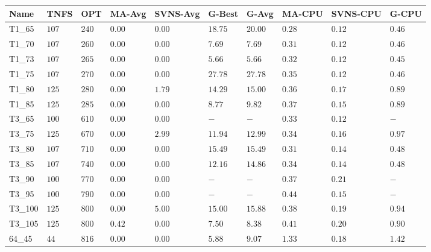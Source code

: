 \begin{center}
    \begin{table}[]
    \centering
    \begin{adjustwidth}{-0.4in}{-1in}
    \begin{tabular}{|lll|l|l|ll|lll|}
\hline
Name    & TNFS    & OPT    & MA-Avg & SVNS-Avg & G-Best  & G-Avg   & MA-CPU & SVNS-CPU & G-CPU \\
\hline
T1\_65  & $107  $ & $240 $ & $\bm{0.00}$ & $\bm{0.00}$   & $18.75$ & $20.00$ & $0.28$ & $0.12$   & $0.46$ \\
T1\_70  & $107  $ & $260 $ & $\bm{0.00}$ & $\bm{0.00}$   & $7.69$  & $7.69$  & $0.31$ & $0.12$   & $0.46$ \\
T1\_73  & $107  $ & $265 $ & $\bm{0.00}$ & $\bm{0.00}$   & $5.66$  & $5.66$  & $0.32$ & $0.12$   & $0.45$ \\
T1\_75  & $107  $ & $270 $ & $\bm{0.00}$ & $\bm{0.00}$   & $27.78$ & $27.78$ & $0.35$ & $0.12$   & $0.46$ \\
T1\_80  & $125  $ & $280 $ & $\bm{0.00}$ & $1.79$   & $14.29$ & $15.00$ & $0.36$ & $0.17$   & $0.89$ \\
T1\_85  & $125  $ & $285 $ & $\bm{0.00}$ & $\bm{0.00}$   & $8.77$  & $9.82$  & $0.37$ & $0.15$   & $0.89$ \\
\hline
T3\_65  & $100  $ & $610 $ & $\bm{0.00}$ & $\bm{0.00}$   & $-$     & $-$     & $0.33$ & $0.12$   & $-   $ \\
T3\_75  & $125  $ & $670 $ & $\bm{0.00}$ & $2.99$   & $11.94$ & $12.99$ & $0.34$ & $0.16$   & $0.97$ \\
T3\_80  & $107  $ & $710 $ & $\bm{0.00}$ & $\bm{0.00}$   & $15.49$ & $15.49$ & $0.31$ & $0.14$   & $0.48$ \\
T3\_85  & $107  $ & $740 $ & $\bm{0.00}$ & $\bm{0.00}$   & $12.16$ & $14.86$ & $0.34$ & $0.14$   & $0.48$ \\
T3\_90  & $100  $ & $770 $ & $\bm{0.00}$ & $\bm{0.00}$   & $-$     & $-$     & $0.37$ & $0.21$   & $-   $ \\
T3\_95  & $100  $ & $790 $ & $\bm{0.00}$ & $\bm{0.00}$   & $-$     & $-$     & $0.44$ & $0.15$   & $-   $ \\
T3\_100 & $125  $ & $800 $ & $\bm{0.00}$ & $5.00$   & $15.00$ & $15.88$ & $0.38$ & $0.19$   & $0.94$ \\
T3\_105 & $125  $ & $800 $ & $0.42$ & $\bm{0.00}$   & $7.50$  & $8.38$  & $0.41$ & $0.20$   & $0.90$ \\
\hline
64\_45  & $44   $ & $816 $ & $\bm{0.00}$ & $\bm{0.00}$   & $5.88$  & $9.07$  & $1.33$ & $0.18$   & $1.42$ \\

\end{tabular}
\end{adjustwidth}
\end{table}
\end{center}
